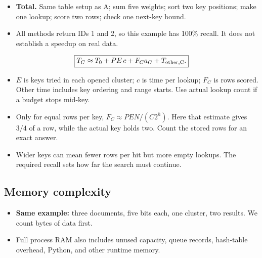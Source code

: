 \begin{itemize}
\item \textbf{Total.} Same table setup as A; sum five weights; sort two key positions; make one lookup; score two rows; check one next-key bound.
\item All methods return IDs 1 and 2, so this example has 100\% recall. It does not establish a speedup on real data.
\end{itemize}
\[
 \boxed{T_C\approx T_0+PE\,c+F_Ca_C+T_{\rm other,C}.}
\]
\begin{itemize}
\item $E$ is keys tried in each opened cluster; $c$ is time per lookup; $F_C$ is rows scored.
Other time includes key ordering and range starts. Use actual lookup count if a budget stops mid-key.
\item Only for equal rows per key, $F_C\approx PEN/(C2^h)$. Here that estimate gives
$3/4$ of a row, while the actual key holds two. Count the stored rows for an exact answer.
\item Wider keys can mean fewer rows per hit but more empty lookups. The required recall
sets how far the search must continue.
\end{itemize}

\newpage
\subsection{Memory complexity}
\begin{itemize}
\item \textbf{Same example:} three documents, five bits each, one cluster, two results. We count bytes of data first.
\item Full process RAM also includes unused capacity, queue records, hash-table overhead, Python, and other runtime memory.
\end{itemize}

